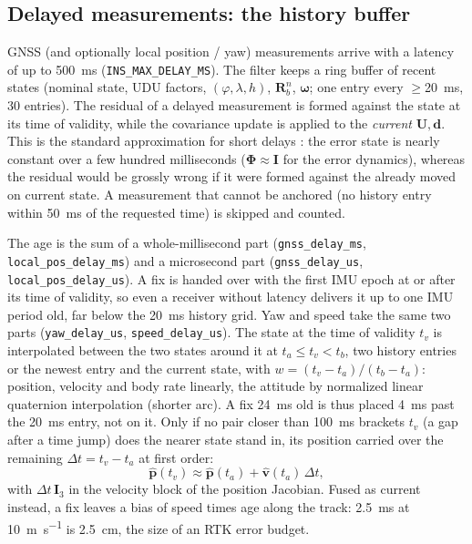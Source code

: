 \documentclass[11pt,a4paper]{article}
\newcommand{\vect}[1]{\bm{#1}}
\newcommand{\mat}[1]{\bm{#1}}
\newcommand{\nframe}{n}
\newcommand{\bframe}{b}
\newcommand{\Rbn}{\mat{R}_{\bframe}^{\nframe}}
\newcommand{\code}[1]{\texttt{#1}}
\begin{document}
\subsection{Delayed measurements: the history buffer}
\label{sec:delayed}

GNSS (and optionally local position / yaw) measurements arrive with
a latency of up to \SI{500}{\milli\second}
(\code{INS\_\allowbreak{}MAX\_\allowbreak{}DELAY\_\allowbreak{}MS}).
The filter keeps a ring buffer of recent states (nominal state, UDU
factors, $(\varphi,\lambda,h)$, $\Rbn$, $\vect{\omega}$; one entry every
$\geq$\SI{20}{\milli\second}, 30 entries). The residual of a delayed
measurement is formed against the state at its time of validity, while the
covariance update is applied to the \emph{current} $\mat{U}, \vect{d}$.
This is the standard approximation for short delays \cite{wendel2011,zwiener2019}: the error state is
nearly constant over a few hundred milliseconds
($\mat{\Phi} \approx \mat{I}$ for the error dynamics), whereas the
residual would be grossly wrong if it were formed against the already
moved on current state. A measurement that cannot
be anchored (no history entry within \SI{50}{\milli\second} of the requested
time) is skipped and counted.

The age is the sum of a whole-millisecond part
(\code{gnss\_\allowbreak{}delay\_\allowbreak{}ms},
\code{local\_\allowbreak{}pos\_\allowbreak{}delay\_\allowbreak{}ms}) and a
microsecond part (\code{gnss\_\allowbreak{}delay\_\allowbreak{}us},
\code{local\_\allowbreak{}pos\_\allowbreak{}delay\_\allowbreak{}us}).
A fix is handed over with the first IMU epoch at or after its time of
validity, so even a receiver without latency delivers it up to one IMU period
old, far below the \SI{20}{\milli\second} history grid. Yaw and speed take
the same two parts (\code{yaw\_\allowbreak{}delay\_\allowbreak{}us},
\code{speed\_\allowbreak{}delay\_\allowbreak{}us}). The state at the time of
validity $t_v$ is interpolated between the two states around it at
$t_a \le t_v < t_b$, two history entries or the newest entry and the current
state, with $w = (t_v - t_a)/(t_b - t_a)$: position, velocity and body rate
linearly, the attitude by normalized linear quaternion interpolation (shorter
arc). A fix \SI{24}{\milli\second} old is thus placed \SI{4}{\milli\second}
past the \SI{20}{\milli\second} entry, not on it. Only if no pair closer than
\SI{100}{\milli\second} brackets $t_v$ (a gap after a time jump) does the
nearer state stand in, its position carried over the remaining
$\Delta t = t_v - t_a$ at first order:
\begin{equation}
  \hat{\vect{p}}(t_v) \approx \hat{\vect{p}}(t_a) + \hat{\vect{v}}(t_a)\,\Delta t ,
\end{equation}
with $\Delta t\,\mat{I}_3$ in the velocity block of the position Jacobian.
Fused as current instead, a fix leaves a bias of speed times age along the
track: \SI{2.5}{\milli\second} at \SI{10}{\metre\per\second} is
\SI{2.5}{\centi\metre}, the size of an RTK error budget.
\end{document}
